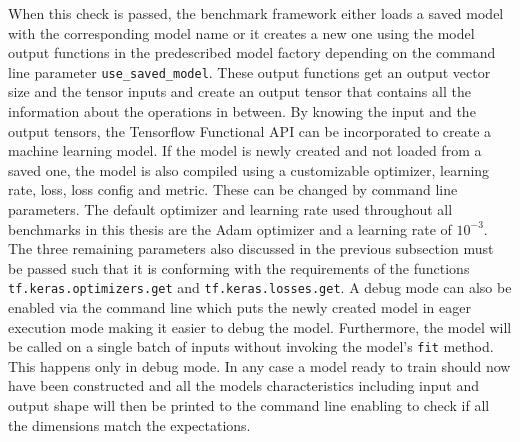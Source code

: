 \documentclass[draft,final]{vutinfth} %
\begin{document}
    When this check is passed, the benchmark framework either loads a saved model with the corresponding model name or it creates a new one using the model output functions in the predescribed model factory depending on the command line parameter \texttt{use\_saved\_model}.
    These output functions get an output vector size and the tensor inputs and create an output tensor that contains all the information about the operations in between.
    By knowing the input and the output tensors, the Tensorflow \cite{Tensorflow} Functional API can be incorporated to create a machine learning model.
    If the model is newly created and not loaded from a saved one, the model is also compiled using a customizable optimizer, learning rate, loss, loss config and metric.
    These can be changed by command line parameters.
    The default optimizer and learning rate used throughout all benchmarks in this thesis are the Adam optimizer \cite{Adam} and a learning rate of $10^{-3}$.
    The three remaining parameters also discussed in the previous subsection must be passed such that it is conforming with the requirements of the functions \texttt{tf.keras.optimizers.get} and \texttt{tf.keras.losses.get}.
    A debug mode can also be enabled via the command line which puts the newly created model in eager execution mode making it easier to debug the model. Furthermore, the model will be called on a single batch of inputs without invoking the model's \texttt{fit} method. This happens only in debug mode.
    In any case a model ready to train should now have been constructed and all the models characteristics including input and output shape will then be printed to the command line enabling to check if all the dimensions match the expectations.
\end{document}
